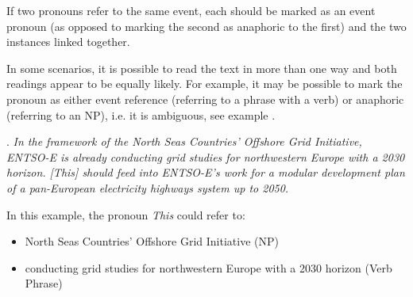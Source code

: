 \documentclass[a4paper]{article}
\begin{document}
% 
% 
% 
If two pronouns refer to the same event, each should be marked as an event pronoun (as opposed to marking the second as anaphoric to the first) and the two instances linked together.

In some scenarios, it is possible to read the text in more than one way and both readings appear to be equally likely. For example, it may be possible to mark the pronoun as either event reference (referring to a phrase with a verb) or
anaphoric (referring to an NP), i.e. it is ambiguous, see example \Next.

\ex.
{\sl In the framework of the North Seas Countries’ Offshore Grid Initiative, ENTSO-E is already conducting grid studies for northwestern Europe with a 2030 horizon. [This] should feed into ENTSO-E's work for a modular development plan of a pan-European electricity highways system up to 2050.}

In this example, the pronoun {\sl This} could refer to:
\begin{itemize}
\item North Seas Countries’ Offshore Grid Initiative (NP)
\item conducting grid studies for northwestern Europe with a 2030 horizon (Verb
Phrase)
\end{itemize}
\end{document}
